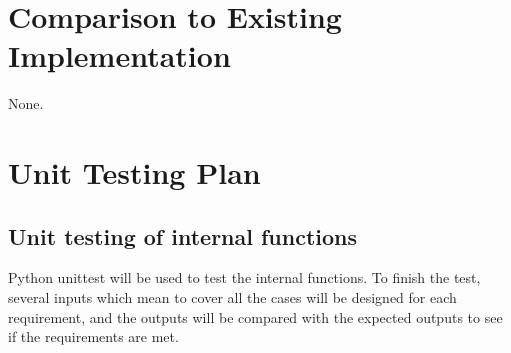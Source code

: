 \documentclass[12pt, titlepage]{article}
\begin{document}
\section{Comparison to Existing Implementation}	
None.
\section{Unit Testing Plan}
		
\subsection{Unit testing of internal functions}
Python unittest will be used to test the internal functions. To finish the test, several inputs which mean to cover all the cases will be designed for each requirement, and the outputs will be compared with the expected outputs to see if the requirements are met.\\
\end{document}
